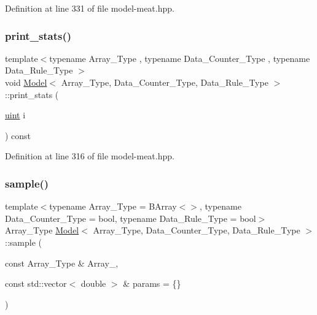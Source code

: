 Definition at line 331 of file model-\/meat.\+hpp.

\mbox{\label{class_model_ac00b5c6a1446ad00fdf1d92c9cb1df3c}} 
\subsubsection{\texorpdfstring{print\+\_\+stats()}{print\_stats()}}
{\footnotesize\ttfamily template$<$typename Array\+\_\+\+Type , typename Data\+\_\+\+Counter\+\_\+\+Type , typename Data\+\_\+\+Rule\+\_\+\+Type $>$ \\
void \hyperlink{class_model}{Model}$<$ Array\+\_\+\+Type, Data\+\_\+\+Counter\+\_\+\+Type, Data\+\_\+\+Rule\+\_\+\+Type $>$\+::print\+\_\+stats (\begin{DoxyParamCaption}\item[{\hyperlink{typedefs_8hpp_a91ad9478d81a7aaf2593e8d9c3d06a14}{uint}}]{i }\end{DoxyParamCaption}) const\hspace{0.3cm}{\ttfamily [inline]}}



Definition at line 316 of file model-\/meat.\+hpp.

\mbox{\label{class_model_a59e37db45e1751a6205db129a5c114c1}} 
\subsubsection{\texorpdfstring{sample()}{sample()}\hspace{0.1cm}{\footnotesize\ttfamily [1/2]}}
{\footnotesize\ttfamily template$<$typename Array\+\_\+\+Type  = B\+Array$<$$>$, typename Data\+\_\+\+Counter\+\_\+\+Type  = bool, typename Data\+\_\+\+Rule\+\_\+\+Type  = bool$>$ \\
Array\+\_\+\+Type \hyperlink{class_model}{Model}$<$ Array\+\_\+\+Type, Data\+\_\+\+Counter\+\_\+\+Type, Data\+\_\+\+Rule\+\_\+\+Type $>$\+::sample (\begin{DoxyParamCaption}\item[{const Array\+\_\+\+Type \&}]{Array\+\_\+,  }\item[{const std\+::vector$<$ double $>$ \&}]{params = {\ttfamily \{\}} }\end{DoxyParamCaption})}

